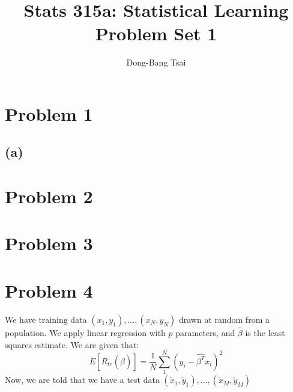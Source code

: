 \documentclass[10pt, letterpaper]{article}
\author{Dong-Bang Tsai}
\title{Stats 315a: Statistical Learning \\ Problem Set 1}
\begin{document}
\maketitle




\section*{Problem 1}
\subsection*{(a)}

\vspace{10 mm}

\section*{Problem 2}


\vspace{10 mm}

\section*{Problem 3}


\vspace{10 mm}

\section*{Problem 4}
We have training data $(x_1, y_1),...,(x_N, y_N)$ drawn at random from a population. We apply linear regression with $p$ parameters, and $\hat{\beta}$ is the least squares estimate. We are given that:
$$E[R_{tr}(\hat{\beta})] = \frac{1}{N}\sum_1^N(y_i - \hat{\beta^T}x_i)^2$$
Now, we are told that we have a test data $(\tilde{x}_1, \tilde{y}_1),...,(\tilde{x}_M, \tilde{y}_M)$

\vspace{10 mm}
\end{document}
